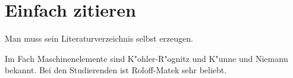 \section{Einfach zitieren}

Man muss sein Literaturverzeichnis selbst erzeugen.

Im Fach Maschinenelemente sind K"ohler-R"ognitz\cite{koeroe} und K"unne\cite{kuenne} und Niemann\cite{niema} bekannt.
Bei den Studierenden ist Roloff-Matek\cite{roloff} sehr beliebt.
